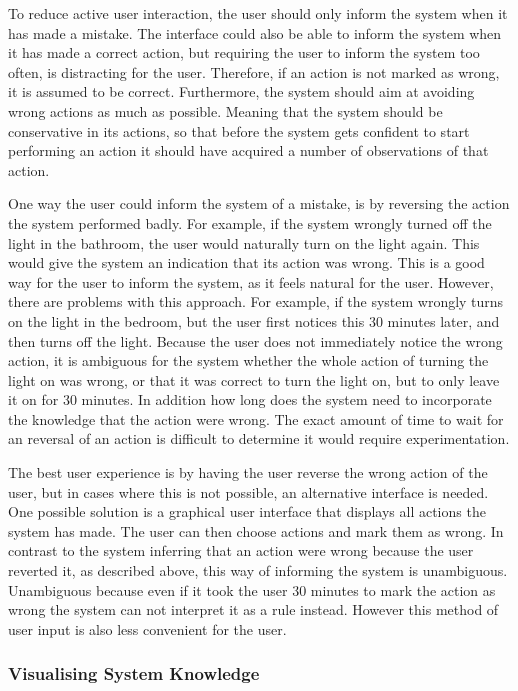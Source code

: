To reduce active user interaction, the user should only inform the system when it has made a mistake. The interface could also be able to inform the system when it has made a correct action, but requiring the user to inform the system too often, is distracting for the user. Therefore, if an action is not marked as wrong, it is assumed to be correct. Furthermore, the system should aim at avoiding wrong actions as much as possible. Meaning that the system should be conservative in its actions, so that before the system gets confident to start performing an action it should have acquired a number of observations of that action.

One way the user could inform the system of a mistake, is by reversing the action the system performed badly. For example, if the system wrongly turned off the light in the bathroom, the user would naturally turn on the light again. This would give the system an indication that its action was wrong. This is a good way for the user to inform the system, as it feels natural for the user. However, there are problems with this approach. For example, if the system wrongly turns on the light in the bedroom, but the user first notices this 30 minutes later, and then turns off the light. Because the user does not immediately notice the wrong action, it is ambiguous for the system whether the whole action of turning the light on was wrong, or that it was correct to turn the light on, but to only leave it on for 30 minutes. In addition how long does the system need to incorporate the knowledge that the action were wrong. The exact amount of time to wait for an reversal of an action is difficult to determine it would require experimentation. 

The best user experience is by having the user reverse the wrong action of the user, but in cases where this is not possible, an alternative interface is needed. One possible solution is a graphical user interface that displays all actions the system has made. The user can then choose actions and mark them as wrong. In contrast to the system inferring that an action were wrong because the user reverted it, as described above, this way of informing the system is unambiguous. Unambiguous because even if it took the user 30 minutes to mark the action as wrong the system can not interpret it as a rule instead. However this method of user input is also less convenient for the user.

\subsubsection{Visualising System Knowledge}

